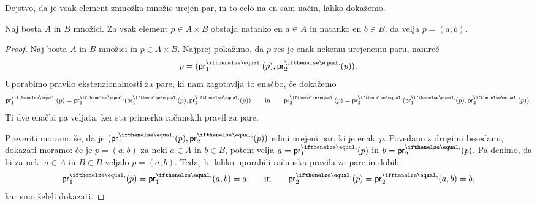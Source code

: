 Dejstvo, da je vsak element zmnožka množic urejen par, in to celo na en sam način, lahko
dokažemo.

\begin{trditev}
  Naj bosta $A$ in $B$ množici. Za vsak element $p \in A \times B$ obstaja natanko en
  $a \in A$ in natanko en $b \in B$, da velja $p = (a, b)$.
\end{trditev}

\begin{proof}
  Naj bosta $A$ in $B$ množici in $p \in A \times B$. Najprej pokažimo, da $p$ res je enak
  nekemu urejenemu paru, namreč
  \begin{equation*}
    p = (\fst(p), \snd(p)).
  \end{equation*}
  Uporabimo pravilo ekstenzionalnosti za pare, ki nam zagotavlja to enačbo, če dokažemo
  \begin{equation*}
    \fst(p) = \fst(\fst(p), \snd(p))
    \qquad\text{in}\qquad
    \snd(p) = \snd(\fst(p), \snd(p)).
  \end{equation*}
  Ti dve enačbi pa veljata, ker sta primerka računskih pravil za pare.

  Preveriti moramo še, da je $(\fst(p), \snd(p))$ edini urejeni par, ki je enak~$p$.
  Povedano z drugimi besedami, dokazati moramo: če je $p = (a, b)$ za neki $a \in A$ in
  $b \in B$, potem velja $a = \fst(p)$ in $b = \snd(p)$. Pa denimo, da bi za neki
  $a \in A$ in $B \in B$ veljalo $p = (a,b)$. Tedaj bi lahko uporabili računska pravila za
  pare in dobili
  \begin{equation*}
    \fst(p) = \fst(a, b) = a
    \qquad\text{in}\qquad
    \snd(p) = \snd(a, b) = b,
  \end{equation*}
  kar smo želeli dokazati.
\end{proof}

